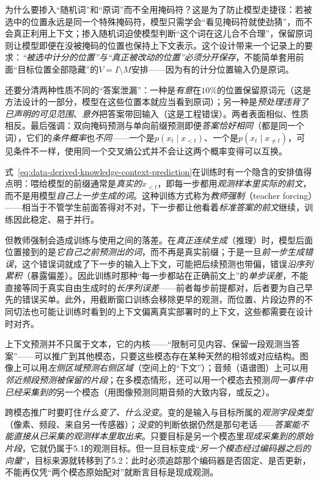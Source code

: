 为什么要掺入“随机词”和“原词”而不全用掩码符？这是为了防止模型走捷径：若被选中的位置永远是同一个特殊掩码符，模型只需学会“看见掩码符就使劲猜”，而不会真正利用上下文；掺入随机词迫使模型判断“这个词在这儿合不合理”，保留原词则让模型即便在没被掩码的位置也保持上下文表示。这个设计带来一个记录上的要求：\emph{“被选中计分的位置”与“真正被改动的位置”必须分开保存}，不能简单套用前面“目标位置全部隐藏”的$V=I\setminus M$安排——因为有的计分位置输入仍是原词。

还要分清两种性质不同的“答案泄漏”：一种是\emph{有意}在$10\%$的位置保留原词元（这是方法设计的一部分，模型在这些位置本就应当看到原词）；另一种是\emph{预处理违背了已声明的可见范围}、\emph{意外}把答案带回输入（这是工程错误）。两者表面相似、性质相反。最后强调：双向掩码预测与单向前缀预测即便\emph{答案恰好相同}（都是同一个词），它们的\emph{条件概率}也\emph{不同}——一个是$p(x_t\mid x_{<t})$、一个是$p(x_t\mid x_{\neq t})$，可见条件不一样，使用同一个交叉熵公式并不会让这两个概率变得可以互换。

式~\eqref{eq:data-derived-knowledge-context-prediction}在训练时有一个隐含的安排值得点明：喂给模型的前缀通常是\emph{真实的}$x_{<t}$，即每一步都用\emph{观测样本里实际的前文}，而不是用模型\emph{自己上一步生成的词}。这种训练方式称为\emph{教师强制}（teacher forcing）——相当于不管学生前面答得对不对，下一步都让他看着\emph{标准答案的前文}继续，训练因此稳定、易于并行。

但教师强制会造成训练与使用之间的落差。在\emph{真正连续生成}（推理）时，模型后面位置接到的是\emph{它自己之前预测出的词}，而不再是真实前缀；于是一旦\emph{前一步生成错误}，这个错误词就成了下一步的输入上下文，可能把后续预测也带偏，错误\emph{沿序列累积}（暴露偏差）。因此训练时那种“每一步都站在正确前文上”的\emph{单步误差}，不能直接等同于真实自由生成时的\emph{长序列误差}——前者每步前提都对，后者要为自己早先的错误买单。此外，用截断窗口训练会移除更早的观测，而位置、片段边界的不同切法也可能让训练时看到的上下文偏离真实部署时的上下文，这些都需要在设计时对齐。

上下文预测并不只属于文本，它的内核——“限制可见内容、保留一段观测当答案”——可以推广到其他模态，只要这些模态存在某种天然的相邻或对应结构。图像上可以用\emph{左侧区域预测右侧区域}（空间上的“下文”）；音频（语谱图）上可以用\emph{邻近频段预测被保留的片段}；在多模态情形，还可以用一个模态去预测\emph{同一事件中已经采集到的}另一个模态（用图像预测同期音频的大致内容，或反之）。

跨模态推广时要盯住\emph{什么变了、什么没变}。变的是输入与目标所属的\emph{观测字段类型}（像素、频段、来自另一传感器）；\emph{没变}的判断依据仍然是那句老话——\emph{答案能不能直接从已采集的观测样本里取出来}。只要目标是另一个模态里\emph{现成采集到的原始片段}，它就仍属于5.1的观测目标。但一旦目标变成“\emph{另一个模态经过编码器之后的向量}”，目标来源就转移到了5.2：此时必须追踪那个编码器是否固定、是否更新，不能再仅凭“两个模态原始配对”就断言目标是现成观测。

